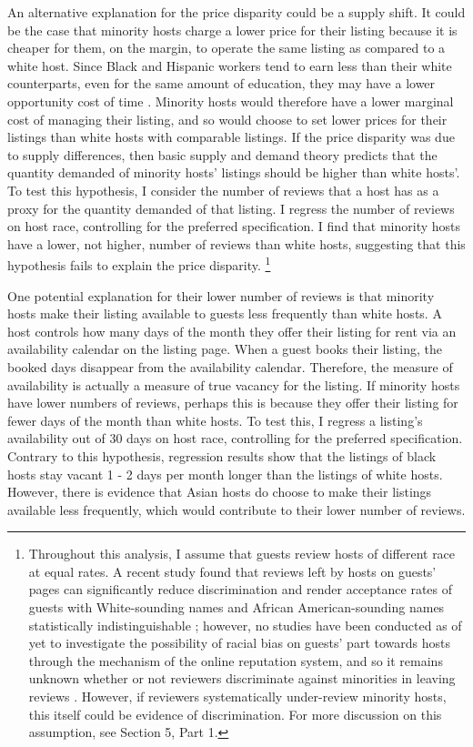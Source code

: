 An alternative explanation for the price disparity could be a supply shift. It could be the case that minority hosts charge a lower price for their listing because it is cheaper for them, on the margin, to operate the same listing as compared to a white host. Since Black and Hispanic workers tend to earn less than their white counterparts, even for the same amount of education, they may have a lower opportunity cost of time \citep{wages}. Minority hosts would therefore have a lower marginal cost of managing their listing, and so would choose to set lower prices for their listings than white hosts with comparable listings. If the price disparity was due to supply differences, then basic supply and demand theory predicts that the quantity demanded of minority hosts' listings should be higher than white hosts'. To test this hypothesis, I consider the number of reviews that a host has as a proxy for the quantity demanded of that listing. I regress the number of reviews on host race, controlling for the preferred specification. I find that minority hosts have a lower, not higher, number of reviews than white hosts, suggesting that this hypothesis fails to explain the price disparity.%
	\footnote{Throughout this analysis, I assume that guests review hosts of different race at equal rates. A recent study found that reviews left by hosts on guests’ pages can significantly reduce discrimination and render acceptance rates of guests with White-sounding names and African American-sounding names statistically indistinguishable \citep{cui}; however, no studies have been conducted as of yet to investigate the possibility of racial bias on guests’ part towards hosts through the mechanism of the online reputation system, and so it remains unknown whether or not reviewers discriminate against minorities in leaving reviews \citep{ye}. However, if reviewers systematically under-review minority hosts, this itself could be evidence of discrimination. For more discussion on this assumption, see Section 5, Part 1.} 

One potential explanation for their lower number of reviews is that minority hosts make their listing available to guests less frequently than white hosts. A host controls how many days of the month they offer their listing for rent via an availability calendar on the listing page. When a guest books their listing, the booked days disappear from the availability calendar. Therefore, the measure of availability is actually a measure of true vacancy for the listing. If minority hosts have lower numbers of reviews, perhaps this is because they offer their listing for fewer days of the month than white hosts. To test this, I regress a listing's availability out of 30 days on host race, controlling for the preferred specification. Contrary to this hypothesis, regression results show that the listings of black hosts stay vacant 1 - 2 days per month longer than the listings of white hosts. However, there is evidence that Asian hosts do choose to make their listings available less frequently, which would contribute to their lower number of reviews. 

